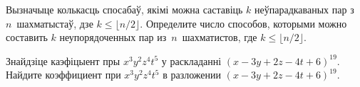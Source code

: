 \documentclass[12pt, a4paper]{article}
\begin{document}
\begin{problemList}
\bigskip

\problemItemSimple
{Вызначыце колькасць спосабаў, якімі можна саставіць $k$ неўпарадкаваных
пар з~$n$~шахматыстаў, дзе $k \le \lfloor n/2\rfloor$.}
{Определите число способов, которыми можно составить $k$ неупорядоченных
пар из~$n$~шахматистов, где $k \le \lfloor n/2\rfloor$.}

\bigskip

\problemItemSimple
{Знайдзіце каэфіцыент пры $x^3y^2z^4t^5$ у раскладанні $(x - 3y + 2z - 4t + 6)^{19}$.}
{Найдите коэффициент при $x^3y^2z^4t^5$ в разложении $(x - 3y + 2z - 4t + 6)^{19}$.}

\end{problemList}
\end{document}
